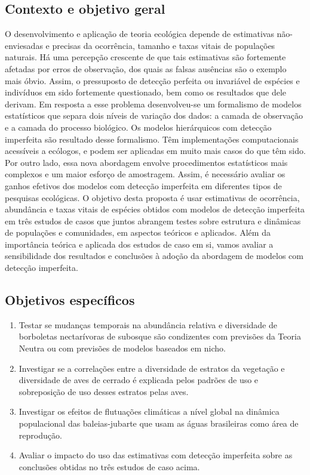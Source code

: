 \documentclass[12pt, A4]{article}
\begin{document}
\subsection{Contexto e objetivo geral}
\label{sec:contexto}
O desenvolvimento e aplicação de teoria ecológica depende de estimativas
não-enviesadas e precisas da ocorrência, tamanho e taxas vitais de
populações naturais. Há uma percepção crescente de que
tais estimativas são fortemente afetadas por erros de observação, dos
quais as falsas ausências são o exemplo mais óbvio. Assim, o
pressuposto de detecção perfeita ou invariável de espécies e
indivíduos em sido fortemente questionado, bem como os resultados que
dele derivam. Em resposta a esse problema desenvolveu-se um formalismo
de modelos estatísticos que separa dois níveis de
variação dos dados: a camada de observação e a camada do processo
biológico. Os  modelos hierárquicos com detecção
imperfeita são resultado desse formalismo. Têm implementações
computacionais acessíveis a ecólogos, e podem ser aplicadas em muito
mais casos do que têm sido. Por outro lado, essa nova abordagem
envolve procedimentos estatísticos mais complexos e um maior esforço
de amostragem. Assim, é necessário avaliar os ganhos efetivos dos
modelos com detecção imperfeita em diferentes tipos de pesquisas
ecológicas. O objetivo desta proposta é usar estimativas de
ocorrência, abundância e taxas vitais de espécies obtidos com modelos
de detecção imperfeita em três estudos de casos que juntos abrangem
testes sobre estrutura e dinâmicas de populações e comunidades, em
aspectos teóricos e aplicados. Além da importância teórica e aplicada
dos estudos de caso em si, vamos avaliar a sensibilidade dos
resultados e conclusões à adoção da abordagem de modelos com detecção
imperfeita.

\subsection{Objetivos específicos}
\label{sec:especificos}

\begin{enumerate}
\item Testar se mudanças temporais na abundância relativa e
  diversidade de borboletas nectarívoras de subosque  
  são condizentes com previsões da Teoria Neutra ou com
  previsões de modelos baseados em nicho. 
\item Investigar se a correlações entre a diversidade de estratos da
  vegetação e diversidade de aves de cerrado é explicada pelos padrões
  de uso e sobreposição de uso desses estratos pelas aves.
\item Investigar os efeitos de flutuações climáticas a nível global na
  dinâmica populacional das baleias-jubarte que usam as águas
  brasileiras como área de reprodução.
\item Avaliar o impacto do uso das estimativas com detecção imperfeita
  sobre as conclusões obtidas no três estudos de caso acima.
\end{enumerate}
\end{document}
